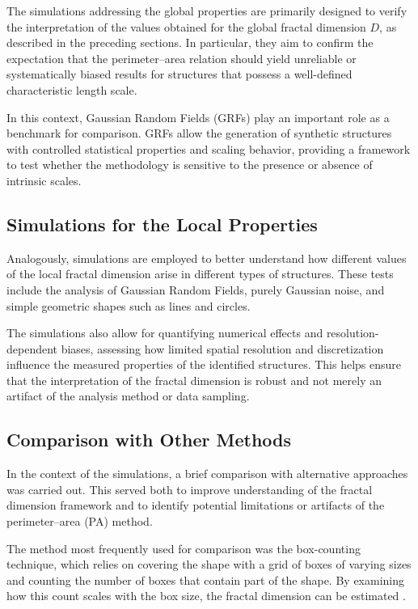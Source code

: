 The simulations addressing the global properties are primarily designed to verify the interpretation of the values obtained for the global fractal dimension $D$, as described in the preceding sections. In particular, they aim to confirm the expectation that the perimeter–area relation should yield unreliable or systematically biased results for structures that possess a well-defined characteristic length scale. 

In this context, Gaussian Random Fields (GRFs) play an important role as a benchmark for comparison. GRFs allow the generation of synthetic structures with controlled statistical properties and scaling behavior, providing a framework to test whether the methodology is sensitive to the presence or absence of intrinsic scales.

\subsection{Simulations for the Local Properties}

Analogously, simulations are employed to better understand how different values of the local fractal dimension arise in different types of structures. These tests include the analysis of Gaussian Random Fields, purely Gaussian noise, and simple geometric shapes such as lines and circles. 

The simulations also allow for quantifying numerical effects and resolution-dependent biases, assessing how limited spatial resolution and discretization influence the measured properties of the identified structures. This helps ensure that the interpretation of the fractal dimension is robust and not merely an artifact of the analysis method or data sampling.

\subsection{Comparison with Other Methods}

In the context of the simulations, a brief comparison with alternative approaches was carried out. This served both to improve understanding of the fractal dimension framework and to identify potential limitations or artifacts of the perimeter–area (PA) method.

The method most frequently used for comparison was the box-counting technique, which relies on covering the shape with a grid of boxes of varying sizes and counting the number of boxes that contain part of the shape. By examining how this count scales with the box size, the fractal dimension can be estimated \cite{falconer2013fractal}. 

